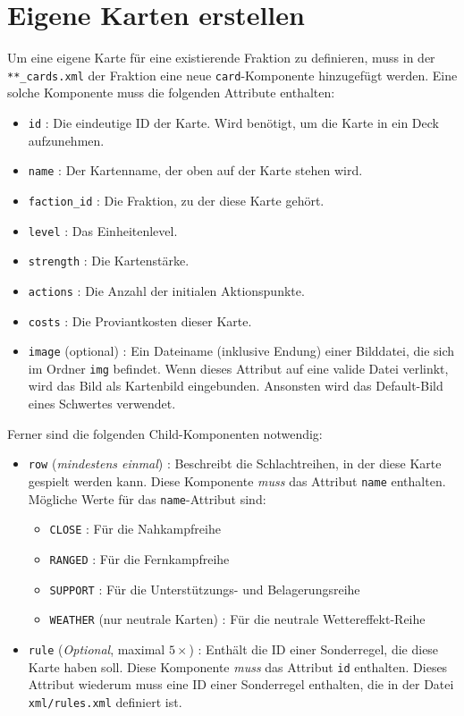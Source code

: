 \documentclass[a4paper,11pt]{report}
\begin{document}
\section{Eigene Karten erstellen}\label{C:newcard}
Um eine eigene Karte für eine existierende Fraktion zu definieren, muss in der \verb+**_cards.xml+ der Fraktion eine neue \verb+card+-Komponente hinzugefügt werden. Eine solche Komponente muss die folgenden Attribute enthalten:
\begin{itemize}
	\item \verb+id+ : Die eindeutige ID der Karte. Wird benötigt, um die Karte in ein Deck aufzunehmen.
	\item \verb+name+ : Der Kartenname, der oben auf der Karte stehen wird.
	\item \verb+faction_id+ : Die Fraktion, zu der diese Karte gehört.
	\item \verb+level+ : Das Einheitenlevel.
	\item \verb+strength+ : Die Kartenstärke.
	\item \verb+actions+ : Die Anzahl der initialen Aktionspunkte.
	\item \verb+costs+ : Die Proviantkosten dieser Karte.
	\item \verb+image+ (optional) : Ein Dateiname (inklusive Endung) einer Bilddatei, die sich im Ordner \verb+img+ befindet. Wenn dieses Attribut auf eine valide Datei verlinkt, wird das Bild als Kartenbild eingebunden. Ansonsten wird das Default-Bild eines Schwertes verwendet.
\end{itemize}

Ferner sind die folgenden Child-Komponenten notwendig:
\begin{itemize}
	\item \verb+row+ (\emph{mindestens einmal}) : Beschreibt die Schlachtreihen, in der diese Karte gespielt werden kann. Diese Komponente \emph{muss} das Attribut \verb+name+ enthalten. Mögliche Werte für das \verb+name+-Attribut sind:
	\begin{itemize}
		\item \verb+CLOSE+ : Für die Nahkampfreihe
		\item \verb+RANGED+ : Für die Fernkampfreihe
		\item \verb+SUPPORT+ : Für die Unterstützungs- und Belagerungsreihe
		\item \verb+WEATHER+ (nur neutrale Karten) : Für die neutrale Wettereffekt-Reihe
	\end{itemize}
	\item \verb+rule+ (\emph{Optional}, maximal $5\times$) : Enthält die ID einer Sonderregel, die diese Karte haben soll. Diese Komponente \emph{muss} das Attribut \verb+id+ enthalten. Dieses Attribut wiederum muss eine ID einer Sonderregel enthalten, die in der Datei \verb+xml/rules.xml+ definiert ist.
\end{itemize}
\end{document}
